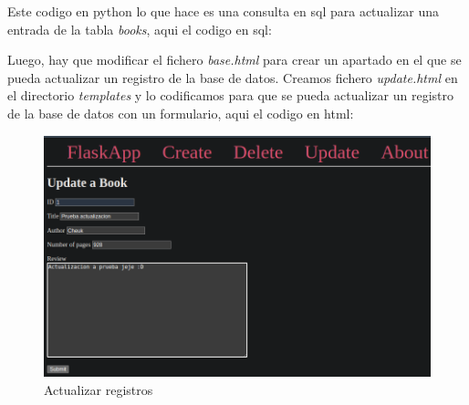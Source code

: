 \documentclass[11pt]{report}
\begin{document}
Este codigo en python lo que hace es una consulta en sql para actualizar una entrada de la tabla \emph{books},
aqui el codigo en sql:
\lstset{style=mystyle}


Luego, hay que modificar el fichero \emph{base.html} para crear un apartado en el que se pueda actualizar
un registro de la base de datos. Creamos fichero \emph{update.html} en el directorio \emph{templates} y
lo codificamos para que se pueda actualizar un registro de la base de datos con un formulario, aqui el codigo
en html:
\lstset{style=mystyle}


\begin{figure}[H]
  \centering
  \includegraphics[scale=0.27]{img/update_book.png}
  \caption{Actualizar registros}
\end{figure}
\end{document}
